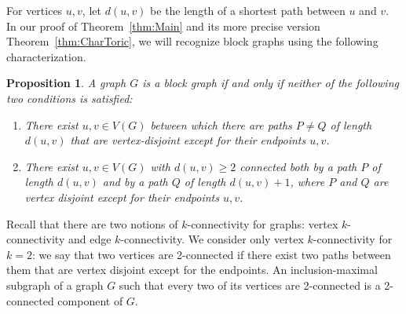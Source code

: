 \documentclass[a4paper, 11pt]{amsart}
\numberwithin{theorem}{section}
\newtheorem{proposition}[theorem]{Proposition}
\begin{document}
For vertices $u,v$, let $d(u,v)$ be the length of a shortest path between
$u$ and $v$. In our proof of Theorem~\ref{thm:Main} and its more precise
version Theorem~\ref{thm:CharToric}, we will recognize block graphs
using the following characterization.

\begin{proposition}\label{prop:char-of-block-graph}
    A graph $G$ is a block graph if and only if neither of the following two conditions is satisfied:
    \begin{enumerate}
        \item There exist $u,v\in V(G)$ between which there are 
	paths $P \neq Q$ of length $d(u,v)$ that are vertex-disjoint
	except for their endpoints $u,v$.

        \item There exist $u,v\in V(G)$ with $d(u,v)\geq 2$ connected
	both by a path $P$ of length $d(u,v)$ and by a path $Q$ of length 
	$d(u,v)+1$, where $P$ and $Q$ are vertex disjoint except for
	their endpoints $u,v$. 
    \end{enumerate}
\end{proposition}

Recall that there are two notions of $k$-connectivity for graphs: vertex
$k$-connectivity and edge $k$-connectivity. We consider only vertex
$k$-connectivity for $k=2$: we say that two vertices are 2-connected if
there exist two paths between them that are vertex disjoint except for the
endpoints. An inclusion-maximal subgraph of a graph $G$ such that every
two of its vertices are 2-connected is a 2-connected component of $G$.
\end{document}
